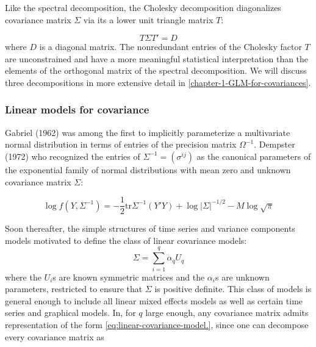 \documentclass[12pt]{article}
\theoremstyle{definition}
\begin{document}
\bigskip

Like the spectral decomposition, the Cholesky decomposition diagonalizes covariance matrix $\Sigma$ via its a lower unit triangle matrix $T$:

\begin{equation} \label{eq:modified-cholesky-decomposition}
T \Sigma T' = D
\end{equation} 
\noindent
where $D$ is a diagonal matrix. The nonredundant entries of the Cholesky factor $T$ are unconstrained and have a more meaningful statistical interpretation than the elements of the orthogonal matrix of the spectral decomposition. We will discuss three decompositions in more extensive detail in \ref{chapter-1-GLM-for-covariances}.


\subsubsection{Linear models for covariance}
Gabriel (1962) was among the first to implicitly parameterize a multivariate normal distribution in terms of entries of the precision matrix $\Omega^{-1}$.  Dempster (1972) who recognized the entries of $\Sigma^{-1} = \left(\sigma^{ij} \right)$ as the canonical parameters of the exponential family of normal distributions with mean zero and unknown covariance matrix $\Sigma$:

\[
\log f\left(Y, \Sigma^{-1}\right) = -\frac{1}{2}\mbox{tr}\Sigma^{-1} \left(Y'Y\right) + \log\vert \Sigma \vert^{-1/2} - M \log\sqrt{\pi}
\]

Soon thereafter, the simple structures of time series and variance components models motivated \citet{anderson1973asymptotically} to define the class of linear covariance models:
\begin{equation}\label{eq:linear-covariance-model}
\Sigma = \sum_{i = 1}^q \alpha_qU_q
\end{equation}
\noindent
where the $U_i$s are known symmetric matrices and the $\alpha_i$s are unknown parameters, restricted to ensure that $\Sigma$ is positive definite. This class of models is general enough to include all linear mixed effects models as well as certain time series and graphical models. In, for $q$ large enough, any covariance matrix admits representation of the form \ref{eq:linear-covariance-model.}, since one can decompose every covariance matrix as 
\end{document}
